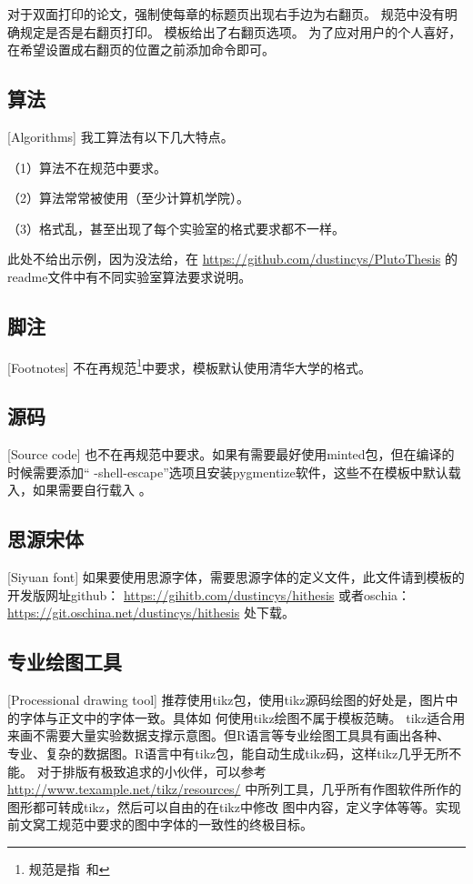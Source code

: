 对于双面打印的论文，强制使每章的标题页出现右手边为右翻页。
规范中没有明确规定是否是右翻页打印。
模板给出了右翻页选项。
为了应对用户的个人喜好，在希望设置成右翻页的位置之前添加命令即可。

\subsection{算法}[Algorithms]
我工算法有以下几大特点。

（1）算法不在规范中要求。

（2）算法常常被使用（至少计算机学院）。

（3）格式乱，甚至出现了每个实验室的格式要求都不一样。

此处不给出示例，因为没法给，在
\href{https://github.com/dustincys/PlutoThesis}{https://github.com/dustincys/PlutoThesis}
的readme文件中有不同实验室算法要求说明。

\subsection{脚注}[Footnotes]
不在再规范\footnote{规范是指\PGR\ 和\UGR}中要求，模板默认使用清华大学的格式。

\subsection{源码}[Source code]
也不在再规范中要求。如果有需要最好使用minted包，但在编译的时候需要添加“
-shell-escape”选项且安装pygmentize软件，这些不在模板中默认载入，如果需要自行载入
。
\subsection{思源宋体}[Siyuan font]
如果要使用思源字体，需要思源字体的定义文件，此文件请到模板的开发版网址github：
\href{https://gihitb.com/dustincys/hithesis}{https://gihitb.com/dustincys/hithesis}
或者oschia：
\href{https://git.oschina.net/dustincys/hithesis}{https://git.oschina.net/dustincys/hithesis}
处下载。

\subsection{专业绘图工具}[Processional drawing tool]
推荐使用tikz包，使用tikz源码绘图的好处是，图片中的字体与正文中的字体一致。具体如
何使用tikz绘图不属于模板范畴。
tikz适合用来画不需要大量实验数据支撑示意图。但R语言等专业绘图工具具有画出各种、
专业、复杂的数据图。R语言中有tikz包，能自动生成tikz码，这样tikz几乎无所不能。
对于排版有极致追求的小伙伴，可以参考
\href{http://www.texample.net/tikz/resources/}{http://www.texample.net/tikz/resources/}
中所列工具，几乎所有作图软件所作的图形都可转成tikz，然后可以自由的在tikz中修改
图中内容，定义字体等等。实现前文窝工规范中要求的图中字体的一致性的终极目标。


